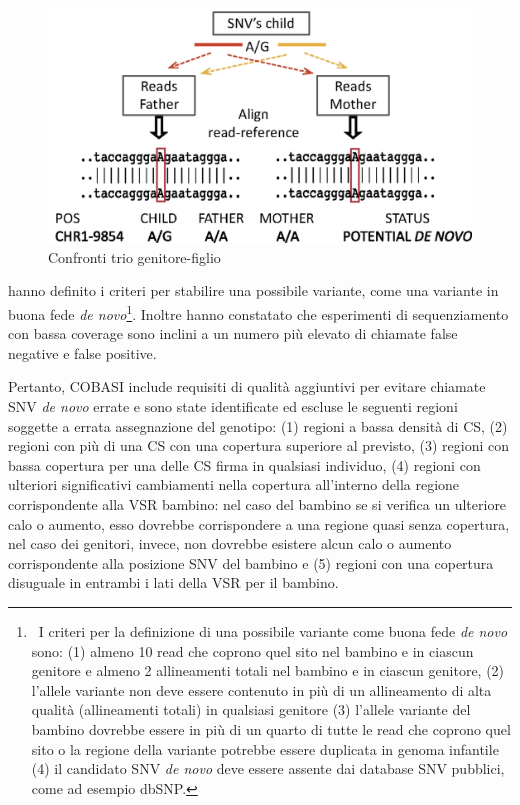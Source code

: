 \documentclass[../main.tex]{subfiles}
\begin{document}
\begin{figure}[ht!]
	\centering
  	\captionsetup{justification=centering}
  	\includegraphics[scale=.20]{images/cobasi_align.png}
  	\caption{Confronti trio genitore-figlio}
  	\label{fig:cobasi_align}
\end{figure}

\noindent
\cite{gomez-romero2018cobasi} hanno definito i criteri per stabilire una possibile variante, come una variante in buona fede \textit{de novo}\footnote{\ I criteri per la definizione di una possibile variante come buona fede \textit{de novo} sono: (1) almeno 10 read che coprono quel sito nel bambino e in ciascun genitore e almeno 2 allineamenti totali nel bambino e in ciascun genitore, (2) l'allele variante non deve essere contenuto in più di un allineamento di alta qualità (allineamenti totali) in qualsiasi genitore (3) l'allele variante del bambino dovrebbe essere in più di un quarto di tutte le read che coprono quel sito o la regione della variante potrebbe essere duplicata in genoma infantile (4) il candidato SNV \textit{de novo} deve essere assente dai database SNV pubblici, come ad esempio dbSNP.}. Inoltre hanno constatato che esperimenti di sequenziamento con bassa coverage sono inclini a un numero più elevato di chiamate false negative e false positive. 

Pertanto, COBASI include requisiti di qualità aggiuntivi per evitare chiamate SNV \textit{de novo} errate e sono state identificate ed escluse le seguenti regioni soggette a errata assegnazione del genotipo: (1) regioni a bassa densità di CS, (2) regioni con più di una CS con una copertura superiore al previsto, (3) regioni con bassa copertura per una delle CS firma in qualsiasi individuo, (4) regioni con ulteriori significativi cambiamenti nella copertura all'interno della regione corrispondente alla VSR bambino: nel caso del bambino se si verifica un ulteriore calo o aumento, esso dovrebbe corrispondere a una regione quasi senza copertura, nel caso dei genitori, invece, non dovrebbe esistere alcun calo o aumento corrispondente alla posizione SNV del bambino e (5) regioni con una copertura disuguale in entrambi i lati della VSR per il bambino.
\end{document}
